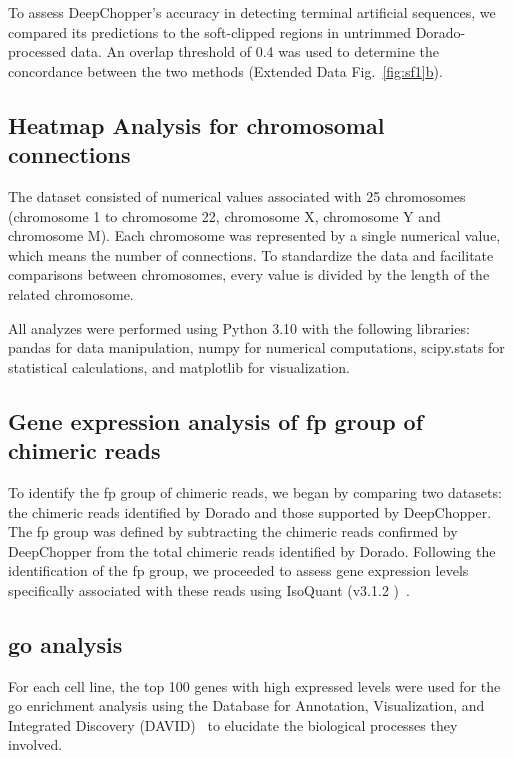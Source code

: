 \documentclass[pdflatex,sn-nature, lineno]{sn-jnl}%
\newcommand{\edfigref}[2]{Extended Data Fig.~\hyperref[#1]{\ref*{#1}#2}}
\theoremstyle{thmstyleone}%
\theoremstyle{thmstyletwo}%
\theoremstyle{thmstylethree}%
\begin{document}
To assess DeepChopper's accuracy in detecting terminal artificial sequences, we compared its predictions to the soft-clipped regions in untrimmed Dorado-processed data.
An overlap threshold of 0.4 was used to determine the concordance between the two methods (\edfigref{fig:sf1}{b}).

\subsection{Heatmap Analysis for chromosomal connections}

The dataset consisted of numerical values associated with 25 chromosomes (chromosome 1 to chromosome 22, chromosome X, chromosome Y and chromosome M). 
Each chromosome was represented by a single numerical value, which means the number of connections.
To standardize the data and facilitate comparisons between chromosomes, every value is divided by the length of the related chromosome.

All analyzes were performed using Python 3.10 with the following libraries: pandas for data manipulation, numpy for numerical computations, scipy.stats for statistical calculations, and matplotlib for visualization.

\subsection{Gene expression analysis of \gls{fp} group of chimeric reads}

To identify the \gls{fp} group of chimeric reads, we began by comparing two datasets: the chimeric reads identified by Dorado and those supported by DeepChopper.
The \gls{fp} group was defined by subtracting the chimeric reads confirmed by DeepChopper from the total chimeric reads identified by Dorado.
Following the identification of the \gls{fp} group, we proceeded to assess gene expression levels specifically associated with these reads using IsoQuant (v3.1.2 )~\cite{prjibelski2023accurate}.


\subsection{\gls{go} analysis}

For each cell line, the top 100 genes with high expressed levels were used for the \gls{go} enrichment analysis using the Database for Annotation, Visualization, and Integrated Discovery (DAVID)~\cite{sherman2022david} to elucidate the biological processes they involved.
\end{document}
